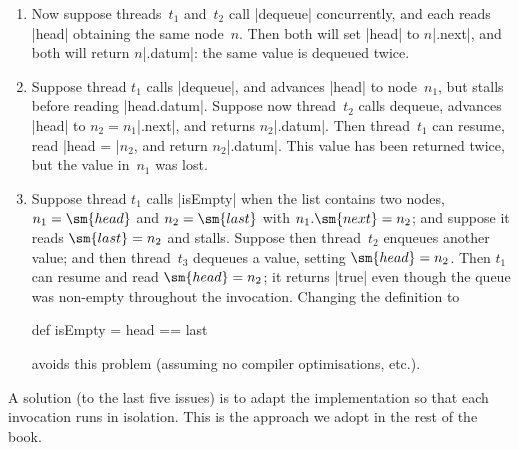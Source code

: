 \begin{answerI}
\begin{enumerate}

\item Now suppose threads~$t_1$ and~$t_2$ call |dequeue| concurrently, and
  each reads |head| obtaining the same node~$n$.  Then both will set |head| to
  $n$|.next|, and both will return $n$|.datum|: the same value is dequeued
  twice.


\item Suppose thread $t_1$ calls |dequeue|, and advances |head| to node~$n_1$,
  but stalls before reading |head.datum|.  Suppose now thread~$t_2$ calls
  dequeue, advances |head| to $n_2 = n_1$|.next|, and returns $n_2$|.datum|.
  Then thread~$t_1$ can resume, read |head = |$n_2$, and
  return $n_2$|.datum|.  This value has been returned twice, but the value
  in~$n_1$ was lost. 

\item Suppose thread $t_1$ calls |isEmpty| when the list contains two nodes,
  $n_1 = \sm{head}$ and $n_2 = \sm{last}$ with $n_1.\sm{next} = n_2$; and
  suppose it reads $\sm{last} = n_2$ and stalls.  Suppose then thread~$t_2$
  enqueues another value; and then thread~$t_3$ dequeues a value, setting
  $\sm{head} = n_2$.  Then $t_1$ can resume and read $\sm{head} = n_2$; it
  returns |true| even though the queue was non-empty throughout the
  invocation. 
%
  Changing the definition to
  \begin{scala}
  def isEmpty = head == last
  \end{scala}%
  avoids this problem (assuming no compiler optimisations, etc.).
\end{enumerate}

A solution (to the last five issues) is to adapt the implementation so that
each invocation runs in isolation.  This is the approach we adopt in the rest
of the book.
\end{answerI}
